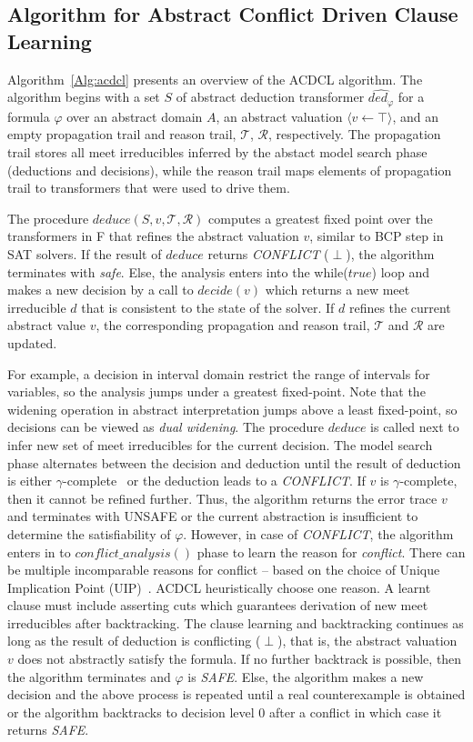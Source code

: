 \subsection{Algorithm for Abstract Conflict Driven Clause Learning}
Algorithm~\ref{Alg:acdcl} presents an overview of the ACDCL algorithm.
The algorithm begins with a set $S$ of abstract deduction transformer 
$\widehat{ded_{\varphi}}$ for a formula $\varphi$ over an abstract 
domain $A$, an abstract valuation $\langle v \leftarrow \top \rangle$, 
and an empty propagation trail and reason trail, $\mathcal{T}$, $\mathcal{R}$, 
respectively.  The propagation trail stores all meet irreducibles inferred 
by the abstact model search phase (deductions and decisions), while the 
reason trail maps elements of propagation trail to transformers that were 
used to drive them.  

The procedure $deduce(S,v,\mathcal{T},\mathcal{R})$ computes a greatest 
fixed point over the transformers in F that refines the abstract valuation 
$v$, similar to BCP step in SAT solvers.  If the result of $deduce$ 
returns {\em CONFLICT} ($\perp$), the algorithm terminates with {\em safe}. 
Else, the analysis enters into the while($true$) loop and makes a new decision 
by a call to $decide(v)$ which returns a new meet irreducible $d$ that is
consistent to the state of the solver.  If $d$ refines the current abstract 
value $v$, the corresponding propagation and reason trail, $\mathcal{T}$ 
and $\mathcal{R}$ are updated. 

For example, a decision in interval domain restrict the range of 
intervals for variables, so the analysis jumps under a 
greatest fixed-point. Note that the widening operation in abstract interpretation 
jumps above a least fixed-point, so decisions can be viewed as 
{\em dual widening}.  The procedure $deduce$ is called next to infer new 
set of meet irreducibles for the current decision.  The model search phase 
alternates between the decision and deduction until the result of deduction 
is either $\gamma$-complete~\cite{gamma} or the deduction leads to a {\em CONFLICT}.  
If $v$ is $\gamma$-complete, then it cannot be refined further.  Thus, the 
algorithm returns the error trace $v$ and terminates with UNSAFE or the 
current abstraction is insufficient to determine the satisfiability of $\varphi$.  
However, in case of {\em CONFLICT}, the algorithm enters in to 
$conflict\_analysis()$ phase to learn the reason for {\em conflict}.  
There can be multiple incomparable reasons for conflict -- based on 
the choice of Unique Implication Point (UIP)~\cite{cdcl}.  ACDCL heuristically 
choose one reason.  A learnt clause must include asserting cuts which 
guarantees derivation of new meet irreducibles after backtracking. The clause 
learning and backtracking continues as long as the result of deduction 
is conflicting ($\perp$), that is, the abstract valuation $v$ does not
abstractly satisfy the formula.  If no further backtrack is possible, 
then the algorithm terminates and $\varphi$ is {\em SAFE}. Else, the 
algorithm makes a new decision and the above process is repeated 
until a real counterexample is obtained or the algorithm backtracks to 
decision level 0 after a conflict in which case it returns {\em SAFE}. 

